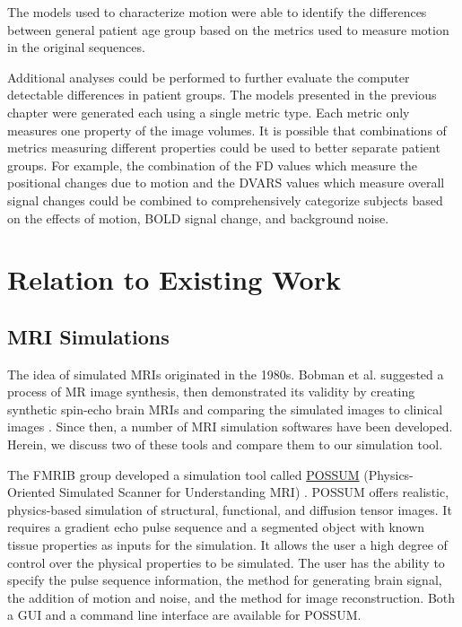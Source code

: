 The models used to characterize motion were able to identify the differences between general patient age group based on the metrics used to measure motion in the original sequences.

Additional analyses could be performed to further evaluate the computer detectable differences in patient groups. The models presented in the previous chapter were generated each using a single metric type. Each metric only measures one property of the image volumes. It is possible that combinations of metrics measuring different properties could be used to better separate patient groups. For example, the combination of the FD values which measure the positional changes due to motion and the DVARS values which measure overall signal changes could be combined to comprehensively categorize subjects based on the effects of motion, BOLD signal change, and background noise.



\section{Relation to Existing Work}

\subsection{MRI Simulations} 

The idea of simulated MRIs originated in the 1980s. Bobman et al. suggested a process of MR image synthesis, then demonstrated its validity by creating synthetic spin-echo brain MRIs and comparing the simulated images to clinical images \cite{Bobman1985}. Since then, a number of MRI simulation softwares have been developed. Herein, we discuss two of these tools and compare them to our simulation tool.

The FMRIB group developed a simulation tool called \href{https://fsl.fmrib.ox.ac.uk/fsl/fslwiki/POSSUM}{POSSUM} (Physics-Oriented Simulated Scanner for Understanding MRI) \cite{Drobnjak2006} \cite{Drobnjak2010}. POSSUM offers realistic, physics-based simulation of structural, functional, and diffusion tensor images. It requires a gradient echo pulse sequence and a segmented object with known tissue properties as inputs for the simulation. It allows the user a high degree of control over the physical properties to be simulated. The user has the ability to specify the pulse sequence information, the method for generating brain signal, the addition of motion and noise, and the method for image reconstruction. Both a GUI and a command line interface are available for POSSUM. 

